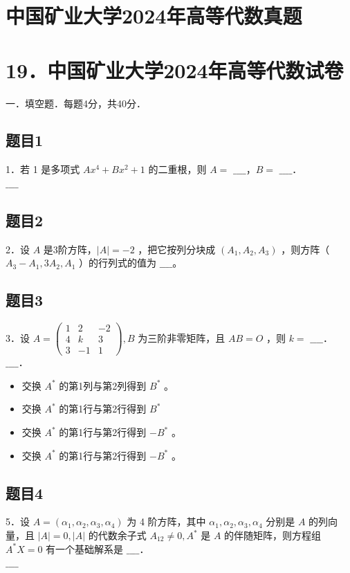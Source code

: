 \documentclass{article}
\begin{document}
\section*{中国矿业大学2024年高等代数真题}
\section*{19．中国矿业大学2024年高等代数试卷}
一．填空题．每题4分，共40分．\\

\subsection{题目1}
1．若 1 是多项式 \(A x^{4}+B x^{2}+1\) 的二重根，则 \(A=\) \(\_\_\_\_\)，\(B=\) \(\_\_\_\_\)．\\
\(\_\_\_\_\)

\subsection{题目2}
2．设 \(A\) 是3阶方阵，\(|A|=-2\) ，把它按列分块成 \(\left(A_{1}, A_{2}, A_{3}\right)\) ，则方阵（ \(A_{3}-A_{1}, 3 A_{2}, A_{1}\) ）的行列式的值为 \(\_\_\_\_\)。

\subsection{题目3}
3．设 \(A=\left(\begin{array}{ccc}1 & 2 & -2 \\ 4 & k & 3 \\ 3 & -1 & 1\end{array}\right), B\) 为三阶非零矩阵，且 \(A B=O\) ，则 \(k=\) \(\_\_\_\_\)．\\
\(\_\_\_\_\)．

\begin{itemize}
  \item[A．] 交换 \(A^{*}\) 的第1列与第2列得到 \(B^{*}\) 。
  \item[B．] 交换 \(A^{*}\) 的第1行与第2行得到 \(B^{*}\)
  \item[C．] 交换 \(A^{*}\) 的第1行与第2行得到 \(-B^{*}\) 。
  \item[D．] 交换 \(A^{*}\) 的第1行与第2行得到 \(-B^{*}\) 。
\end{itemize}

\subsection{题目4}
5．设 \(A=\left(\alpha_{1}, \alpha_{2}, \alpha_{3}, \alpha_{4}\right)\) 为 4 阶方阵，其中 \(\alpha_{1}, \alpha_{2}, \alpha_{3}, \alpha_{4}\) 分别是 \(A\) 的列向量，且 \(|A|=0,|A|\) 的代数余子式 \(A_{12} \neq 0, A^{*}\) 是 \(A\) 的伴随矩阵，则方程组 \(A^{*} X=0\) 有一个基础解系是 \(\_\_\_\_\)．\\
\(\_\_\_\_\)
\end{document}
